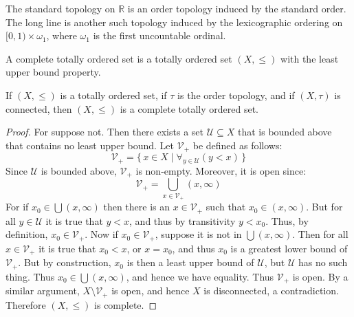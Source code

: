         \begin{example}
                The standard topology on $\mathbb{R}$ is an order topology
                induced by the standard order. The long line is another such
                topology induced by the lexicographic ordering on
                $[0,1)\times\omega_{1}$, where $\omega_{1}$ is the first
                uncountable ordinal.
        \end{example}
        \begin{definition}
                A complete totally ordered set is a totally ordered set
                $(X,\leq)$ with the least upper bound property.
        \end{definition}
        \begin{theorem}
                If $(X,\leq)$ is a totally ordered set, if $\tau$ is the order
                topology, and if $(X,\tau)$ is connected, then $(X,\leq)$ is
                a complete totally ordered set.
        \end{theorem}
        \begin{proof}
            For suppose not. Then there exists a set
            $\mathcal{U}\subseteq{X}$ that is bounded above that contains
            no least upper bound. Let $\mathcal{V}_{+}$ be defined as
            follows:
            \begin{equation}
                \mathcal{V}_{+}=\{\,x\in{X}\;|\;
                    \forall_{y\in\mathcal{U}}(y<x)\,\}
            \end{equation}
            Since $\mathcal{U}$ is bounded above, $\mathcal{V}_{+}$ is
            non-empty. Moreover, it is open since:
            \begin{equation}
                \mathcal{V}_{+}=
                \bigcup_{x\in\mathcal{V}_{+}}(x,\infty)
            \end{equation}
            For if $x_{0}\in\bigcup(x,\infty)$ then there is an
            $x\in\mathcal{V}_{+}$ such that $x_{0}\in(x,\infty)$. But
            for all $y\in\mathcal{U}$ it is true that $y<x$, and thus by
            transitivity $y<x_{0}$. Thus, by definition,
            $x_{0}\in\mathcal{V}_{+}$. Now if $x_{0}\in\mathcal{V}_{+}$,
            suppose it is not in $\bigcup(x,\infty)$. Then for all
            $x\in\mathcal{V}_{+}$ it is true that $x_{0}<x$, or $x=x_{0}$,
            and thus $x_{0}$ is a greatest lower bound of $\mathcal{V}_{+}$.
            But by construction, $x_{0}$ is then a least upper bound of
            $\mathcal{U}$, but $\mathcal{U}$ has no such thing. Thus
            $x_{0}\in\bigcup(x,\infty)$, and hence we have equality.
            Thus $\mathcal{V}_{+}$ is open. By a similar argument,
            ${X}\setminus\mathcal{V}_{+}$ is open, and hence $X$ is
            disconnected, a contradiction. Therefore $(X,\leq)$ is complete.
        \end{proof}
